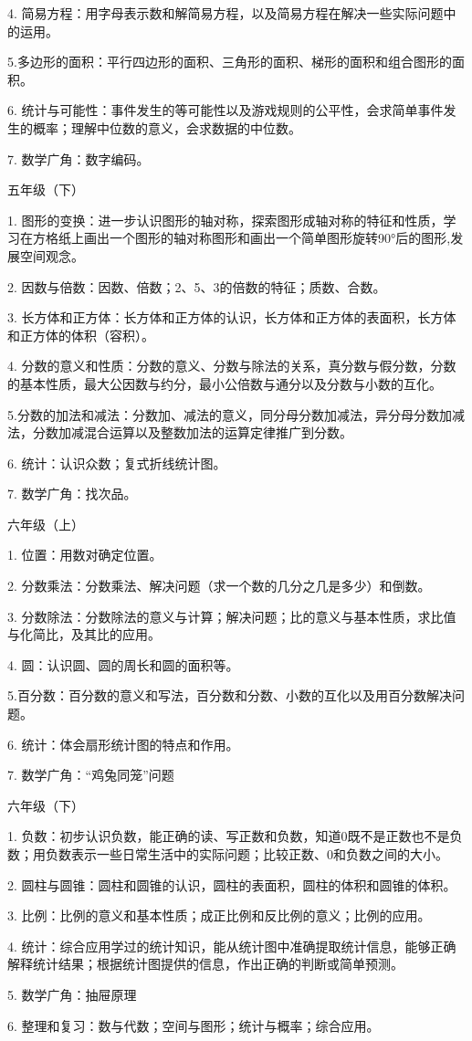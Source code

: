 4. 简易方程：用字母表示数和解简易方程，以及简易方程在解决一些实际问题中的运用。

5.多边形的面积：平行四边形的面积、三角形的面积、梯形的面积和组合图形的面积。

6. 统计与可能性：事件发生的等可能性以及游戏规则的公平性，会求简单事件发生的概率；理解中位数的意义，会求数据的中位数。

7. 数学广角：数字编码。

五年级（下）

1. 图形的变换：进一步认识图形的轴对称，探索图形成轴对称的特征和性质，学习在方格纸上画出一个图形的轴对称图形和画出一个简单图形旋转90°后的图形,发展空间观念。

2. 因数与倍数：因数、倍数；2、5、3的倍数的特征；质数、合数。

3. 长方体和正方体：长方体和正方体的认识，长方体和正方体的表面积，长方体和正方体的体积（容积）。

4. 分数的意义和性质：分数的意义、分数与除法的关系，真分数与假分数，分数的基本性质，最大公因数与约分，最小公倍数与通分以及分数与小数的互化。

5.分数的加法和减法：分数加、减法的意义，同分母分数加减法，异分母分数加减法，分数加减混合运算以及整数加法的运算定律推广到分数。

6. 统计：认识众数；复式折线统计图。

7. 数学广角：找次品。

六年级（上）

1. 位置：用数对确定位置。

2. 分数乘法：分数乘法、解决问题（求一个数的几分之几是多少）和倒数。

3. 分数除法：分数除法的意义与计算；解决问题；比的意义与基本性质，求比值与化简比，及其比的应用。

4. 圆：认识圆、圆的周长和圆的面积等。

5.百分数：百分数的意义和写法，百分数和分数、小数的互化以及用百分数解决问题。

6. 统计：体会扇形统计图的特点和作用。

7. 数学广角：“鸡兔同笼”问题

六年级（下）

1. 负数：初步认识负数，能正确的读、写正数和负数，知道0既不是正数也不是负数；用负数表示一些日常生活中的实际问题；比较正数、0和负数之间的大小。

2. 圆柱与圆锥：圆柱和圆锥的认识，圆柱的表面积，圆柱的体积和圆锥的体积。

3. 比例：比例的意义和基本性质；成正比例和反比例的意义；比例的应用。

4. 统计：综合应用学过的统计知识，能从统计图中准确提取统计信息，能够正确解释统计结果；根据统计图提供的信息，作出正确的判断或简单预测。

5. 数学广角：抽屉原理

6. 整理和复习：数与代数；空间与图形；统计与概率；综合应用。